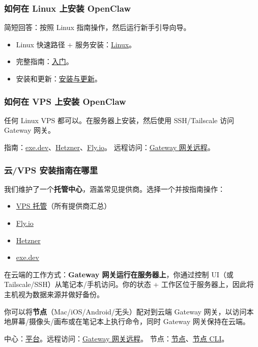 \subsubsection{如何在 Linux 上安装 OpenClaw}


简短回答：按照 Linux 指南操作，然后运行新手引导向导。

\begin{itemize}
  \item Linux 快速路径 + 服务安装：\href{/platforms/linux}{Linux}。
  \item 完整指南：\href{/start/getting-started}{入门}。
  \item 安装和更新：\href{/install/updating}{安装与更新}。
\end{itemize}


\subsubsection{如何在 VPS 上安装 OpenClaw}


任何 Linux VPS 都可以。在服务器上安装，然后使用 SSH/Tailscale 访问 Gateway 网关。

指南：\href{/install/exe-dev}{exe.dev}、\href{/install/hetzner}{Hetzner}、\href{/install/fly}{Fly.io}。
远程访问：\href{/gateway/remote}{Gateway 网关远程}。

\subsubsection{云/VPS 安装指南在哪里}


我们维护了一个\textbf{托管中心}，涵盖常见提供商。选择一个并按指南操作：

\begin{itemize}
  \item \href{/vps}{VPS 托管}（所有提供商汇总）
  \item \href{/install/fly}{Fly.io}
  \item \href{/install/hetzner}{Hetzner}
  \item \href{/install/exe-dev}{exe.dev}
\end{itemize}


在云端的工作方式：\textbf{Gateway 网关运行在服务器上}，你通过控制 UI（或 Tailscale/SSH）从笔记本/手机访问。你的状态 + 工作区位于服务器上，因此将主机视为数据来源并做好备份。

你可以将\textbf{节点}（Mac/iOS/Android/无头）配对到云端 Gateway 网关，以访问本地屏幕/摄像头/画布或在笔记本上执行命令，同时 Gateway 网关保持在云端。

中心：\href{/platforms}{平台}。远程访问：\href{/gateway/remote}{Gateway 网关远程}。
节点：\href{/nodes}{节点}、\href{/cli/nodes}{节点 CLI}。

